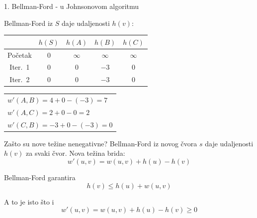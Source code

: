\documentclass{beamer}
\begin{document}
\begin{frame}{1. Bellman-Ford - u Johnsonovom algoritmu}
{%
  }%
  \hspace{0.3em}%
  \raisebox{-.5\height}{\large$\longrightarrow$}%
  \hspace{0.3em}%

  \vspace{0.8em}
  {\scriptsize
  Bellman-Ford iz $S$ daje udaljenosti $h(v)$:

  \vspace{0.3em}
  \begin{tabular}{c|cccc}
               & $h(S)$ & $h(A)$ & $h(B)$ & $h(C)$ \\ \hline
    Početak    & 0 & $\infty$ & $\infty$ & $\infty$ \\
    Iter.\ 1   & 0 & 0 & $-3$ & 0 \\
    Iter.\ 2   & 0 & 0 & $-3$ & 0
  \end{tabular}
  \hspace{1em}
  \begin{tabular}{l}
    $w'(A,B) = 4 + 0 - (-3) = 7$ \\
    $w'(A,C) = 2 + 0 - 0 = 2$ \\
    $w'(C,B) = {-3} + 0 - (-3) = 0$
  \end{tabular}
  }
\end{frame}

\begin{frame}{Zašto su nove težine nenegativne?}
  Bellman-Ford iz novog čvora $s$ daje udaljenosti $h(v)$ za svaki čvor.
  Nova težina brida:
  \[ w'(u, v) = w(u, v) + h(u) - h(v) \]

  Bellman-Ford garantira
  \[ h(v) \leq h(u) + w(u, v) \]

  A to je isto što i
  \[ w'(u, v) = w(u, v) + h(u) - h(v) \geq 0 \]
\end{frame}
\end{document}
